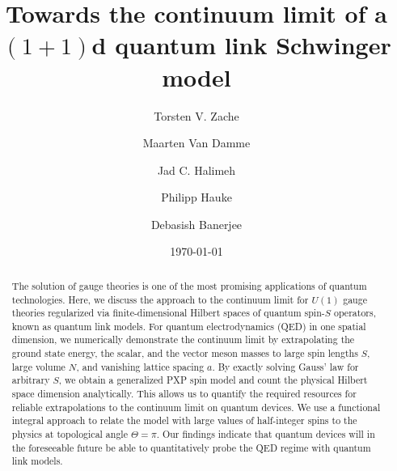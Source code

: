 \documentclass[aps,prl,reprint,twocolumn,superscriptaddress,floatfix,nofootinbib]{revtex4-1}
\title@column\titleblock@produce
\makeatletter
\def\maketitle{
	\@author@finish
	\title@column\titleblock@produce
	\suppressfloats[t]}
\makeatother
\begin{document}
	\title{Towards the continuum limit of a $(1+1)$d quantum link Schwinger model}
	
	
	\author{Torsten V. Zache}
	\author{Maarten Van Damme}
	\author{Jad C. Halimeh}
	\author{Philipp Hauke}
	\author{Debasish Banerjee}
	\date{\today}
	
	\begin{abstract}
		The solution of gauge theories is one of the most promising applications of quantum technologies. Here, we discuss the approach to the continuum limit for $U(1)$ gauge theories regularized via finite-dimensional Hilbert spaces of quantum spin-$S$ operators, known as quantum link models. For quantum electrodynamics (QED) in one spatial dimension, we numerically demonstrate the continuum limit by extrapolating the ground state energy, the scalar, and the vector meson masses to large spin lengths $S$, large volume $N$, and vanishing lattice spacing $a$. By exactly solving Gauss' law for arbitrary $S$, we obtain a generalized PXP spin model and count the physical Hilbert space dimension analytically. This allows us to quantify the required resources for reliable extrapolations to the continuum limit on quantum devices. We use a functional integral approach to relate the model with large values of half-integer spins to the physics at topological angle $\Theta=\pi$. Our findings indicate that quantum devices will in the foreseeable future be able to quantitatively probe the QED regime with quantum link models.
	\end{abstract}
	
	\maketitle
	
\end{document}
